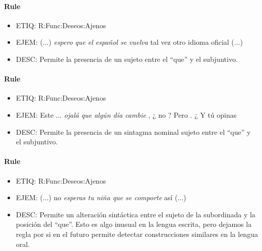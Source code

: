 \documentclass[11pt]{report}
\begin{document}
\paragraph*{Rule}
\begin{itemize}
\item ETIQ: R:Func:Deseos:Ajenos
\item EJEM: (...) \emph{espero que el español se vuelva} tal vez otro idioma oficial (...)
\item DESC: Permite la presencia de un sujeto entre el ``que'' y el subjuntivo.
\end{itemize}

\paragraph*{Rule}
\begin{itemize}
\item ETIQ: R:Func:Deseos:Ajenos
\item EJEM: Este ... \emph{ojalá que algún día cambie} , ¿ no ? Pero . ¿ Y tú opinas
\item DESC: Permite la presencia de un sintagma nominal sujeto entre el ``que'' y el subjuntivo.
\end{itemize}

\paragraph*{Rule}
\begin{itemize}
\item ETIQ: R:Func:Deseos:Ajenos
\item EJEM: (...) no \emph{esperas tu niña que se comporte} así (...)
\item DESC: Permite un alteración sintáctica entre el sujeto de la subordinada y la posición del ``que''. Esto es algo inusual en la lengua escrita, pero dejamos la regla por si en el futuro permite detectar construcciones similares en la lengua oral.
\end{itemize}
\end{document}
